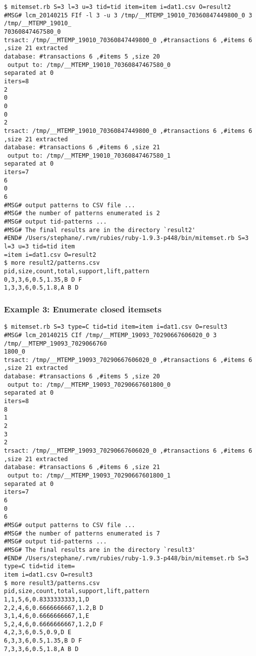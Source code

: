 \begin{Verbatim}[baselinestretch=0.7,frame=single]
$ mitemset.rb S=3 l=3 u=3 tid=tid item=item i=dat1.csv O=result2
#MSG# lcm_20140215 FIf -l 3 -u 3 /tmp/__MTEMP_19010_70360847449800_0 3 /tmp/__MTEMP_19010_
70360847467580_0
trsact: /tmp/__MTEMP_19010_70360847449800_0 ,#transactions 6 ,#items 6 ,size 21 extracted 
database: #transactions 6 ,#items 5 ,size 20
 output to: /tmp/__MTEMP_19010_70360847467580_0
separated at 0
iters=8
2
0
0
0
2
trsact: /tmp/__MTEMP_19010_70360847449800_0 ,#transactions 6 ,#items 6 ,size 21 extracted 
database: #transactions 6 ,#items 6 ,size 21
 output to: /tmp/__MTEMP_19010_70360847467580_1
separated at 0
iters=7
6
0
6
#MSG# output patterns to CSV file ...
#MSG# the number of patterns enumerated is 2
#MSG# output tid-patterns ...
#MSG# The final results are in the directory `result2'
#END# /Users/stephane/.rvm/rubies/ruby-1.9.3-p448/bin/mitemset.rb S=3 l=3 u=3 tid=tid item
=item i=dat1.csv O=result2
$ more result2/patterns.csv
pid,size,count,total,support,lift,pattern
0,3,3,6,0.5,1.35,B D F
1,3,3,6,0.5,1.8,A B D
\end{Verbatim}
\subsubsection*{Example 3: Enumerate closed itemsets}



\begin{Verbatim}[baselinestretch=0.7,frame=single]
$ mitemset.rb S=3 type=C tid=tid item=item i=dat1.csv O=result3
#MSG# lcm_20140215 CIf /tmp/__MTEMP_19093_70290667606020_0 3 /tmp/__MTEMP_19093_7029066760
1800_0
trsact: /tmp/__MTEMP_19093_70290667606020_0 ,#transactions 6 ,#items 6 ,size 21 extracted 
database: #transactions 6 ,#items 5 ,size 20
 output to: /tmp/__MTEMP_19093_70290667601800_0
separated at 0
iters=8
8
1
2
3
2
trsact: /tmp/__MTEMP_19093_70290667606020_0 ,#transactions 6 ,#items 6 ,size 21 extracted 
database: #transactions 6 ,#items 6 ,size 21
 output to: /tmp/__MTEMP_19093_70290667601800_1
separated at 0
iters=7
6
0
6
#MSG# output patterns to CSV file ...
#MSG# the number of patterns enumerated is 7
#MSG# output tid-patterns ...
#MSG# The final results are in the directory `result3'
#END# /Users/stephane/.rvm/rubies/ruby-1.9.3-p448/bin/mitemset.rb S=3 type=C tid=tid item=
item i=dat1.csv O=result3
$ more result3/patterns.csv
pid,size,count,total,support,lift,pattern
1,1,5,6,0.8333333333,1,D
2,2,4,6,0.6666666667,1.2,B D
3,1,4,6,0.6666666667,1,E
5,2,4,6,0.6666666667,1.2,D F
4,2,3,6,0.5,0.9,D E
6,3,3,6,0.5,1.35,B D F
7,3,3,6,0.5,1.8,A B D
\end{Verbatim}
